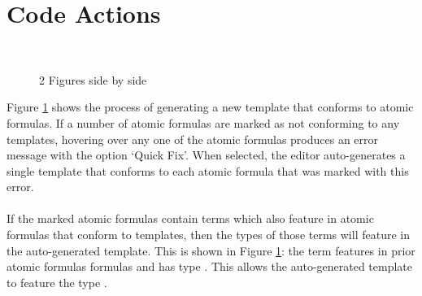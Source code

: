 \documentclass[../main.tex]{subfiles}
\begin{document}
\section{Code Actions}
\begin{figure}%
    \centering
    \\
    \caption{2 Figures side by side}%
    \label{fig:new-template}%
\end{figure}
Figure \ref{fig:new-template} shows the process of generating a new template that conforms to atomic formulas. If a number of atomic formulas are marked as not conforming to any templates, hovering over any one of the atomic formulas produces an error message with the option `Quick Fix'. When selected, the editor auto-generates a single template that conforms to each atomic formula that was marked with this error. 
\\
\\
If the marked atomic formulas contain terms which also feature in atomic formulas that conform to templates, then the types of those terms will feature in the auto-generated template. This is shown in Figure \ref{fig:new-template}: the term  features in prior atomic formulas formulas and has type . This allows the auto-generated template to feature the type .
\end{document}

